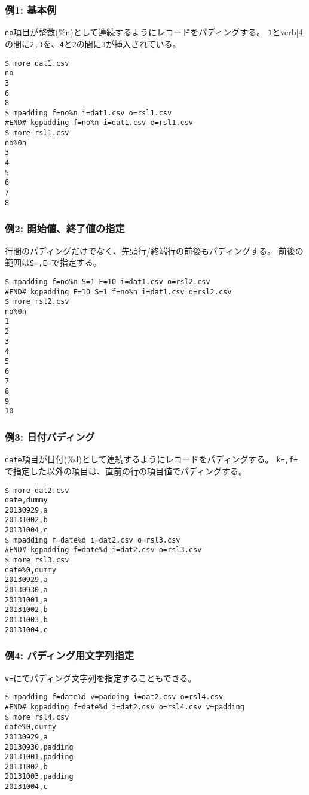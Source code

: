 \subsubsection*{例1: 基本例}

\verb|no|項目が整数(\%n)として連続するようにレコードをパディングする。
\verb|1|とverb|4|の間に\verb|2,3|を、\verb|4|と\verb|2|の間に\verb|3|が挿入されている。


\begin{Verbatim}[baselinestretch=0.7,frame=single]
$ more dat1.csv
no
3
6
8
$ mpadding f=no%n i=dat1.csv o=rsl1.csv
#END# kgpadding f=no%n i=dat1.csv o=rsl1.csv
$ more rsl1.csv
no%0n
3
4
5
6
7
8
\end{Verbatim}
\subsubsection*{例2: 開始値、終了値の指定}

行間のパディングだけでなく、先頭行/終端行の前後もパディングする。
前後の範囲は\verb|S=,E=|で指定する。


\begin{Verbatim}[baselinestretch=0.7,frame=single]
$ mpadding f=no%n S=1 E=10 i=dat1.csv o=rsl2.csv
#END# kgpadding E=10 S=1 f=no%n i=dat1.csv o=rsl2.csv
$ more rsl2.csv
no%0n
1
2
3
4
5
6
7
8
9
10
\end{Verbatim}
\subsubsection*{例3: 日付パディング}

\verb|date|項目が日付(\%d)として連続するようにレコードをパディングする。
\verb|k=,f=|で指定した以外の項目は、直前の行の項目値でパディングする。


\begin{Verbatim}[baselinestretch=0.7,frame=single]
$ more dat2.csv
date,dummy
20130929,a
20131002,b
20131004,c
$ mpadding f=date%d i=dat2.csv o=rsl3.csv
#END# kgpadding f=date%d i=dat2.csv o=rsl3.csv
$ more rsl3.csv
date%0,dummy
20130929,a
20130930,a
20131001,a
20131002,b
20131003,b
20131004,c
\end{Verbatim}
\subsubsection*{例4: パディング用文字列指定}

\verb|v=|にてパディング文字列を指定することもできる。


\begin{Verbatim}[baselinestretch=0.7,frame=single]
$ mpadding f=date%d v=padding i=dat2.csv o=rsl4.csv
#END# kgpadding f=date%d i=dat2.csv o=rsl4.csv v=padding
$ more rsl4.csv
date%0,dummy
20130929,a
20130930,padding
20131001,padding
20131002,b
20131003,padding
20131004,c
\end{Verbatim}
